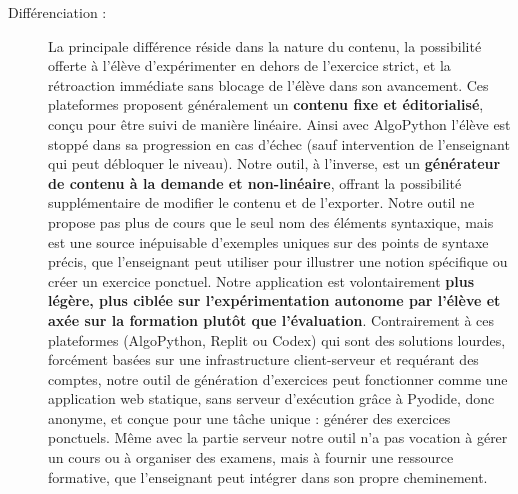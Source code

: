 \documentclass[11pt,a4paper]{article}
\begin{document}
\begin{description}
    \item[Différenciation :] La principale différence réside dans la nature du contenu, la possibilité offerte à l'élève d'expérimenter en dehors de l'exercice strict, et la rétroaction immédiate sans blocage de l'élève dans son avancement. Ces plateformes proposent généralement un \textbf{contenu fixe et éditorialisé}, conçu pour être suivi de manière linéaire. Ainsi avec AlgoPython l'élève est stoppé dans sa progression en cas d'échec (sauf intervention de l'enseignant qui peut débloquer le niveau). Notre outil, à l'inverse, est un \textbf{générateur de contenu à la demande et non-linéaire}, offrant la possibilité supplémentaire de modifier le contenu et de l'exporter. Notre outil ne propose pas plus de cours que le seul nom des éléments syntaxique, mais est une source inépuisable d'exemples uniques sur des points de syntaxe précis, que l'enseignant peut utiliser pour illustrer une notion spécifique ou créer un exercice ponctuel. Notre application est volontairement \textbf{plus légère, plus ciblée sur l'expérimentation autonome par l'élève et axée sur la formation plutôt que l'évaluation}. Contrairement à ces plateformes (AlgoPython, Replit ou Codex) qui sont des solutions lourdes, forcément basées sur une infrastructure client-serveur et requérant des comptes, notre outil de génération d'exercices peut fonctionner comme une application web statique, sans serveur d'exécution grâce à Pyodide, donc anonyme, et conçue pour une tâche unique : générer des exercices ponctuels. Même avec la partie serveur notre outil n'a pas vocation à gérer un cours ou à organiser des examens, mais à fournir une ressource formative, que l'enseignant peut intégrer dans son propre cheminement.
\end{description}
\end{document}
